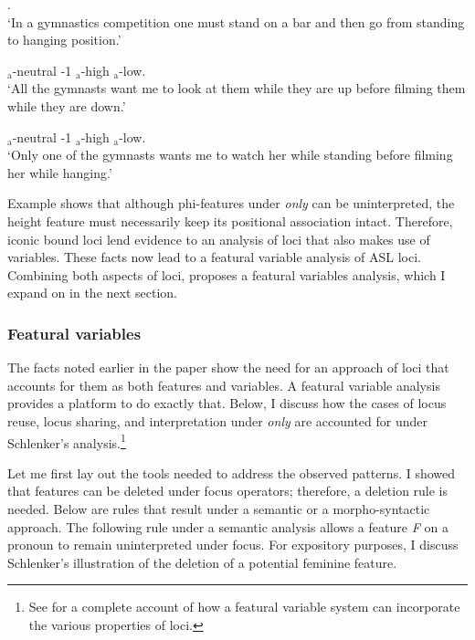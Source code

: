 \documentclass[output=paper,
modfonts
]{langscibook}
\begin{document}
\newpage
\begin{exe}  \label{ex:irani:72}
		\ex {}.\\
		`In a gymnastics competition one must stand on a bar and then go from standing to hanging position.'
	\begin{xlist}	
		\ex  {} $_\text{a}$-{neutral}  -1 $_\text{a}$-{high}  $_\text{a}$-{low}.\\
		`All the gymnasts want me to look at them while they are up before filming them while they are down.'
		
		\ex  {} $_\text{a}$-{neutral}  -1 $_\text{a}$-{high}   $_\text{a}$-{low}. \\
		`Only one of the gymnasts wants me to watch her while standing before filming her while hanging.' \citep[1081]{Schlenker2014}
	\end{xlist}     
\end{exe}

Example  shows that although phi-features under \textit{only} can be uninterpreted, the height feature must necessarily keep its positional association intact. Therefore, iconic bound loci lend evidence to an analysis of loci that also makes use of variables. These facts now lead to a featural variable analysis of ASL loci. Combining both aspects of loci, \citet{Schlenker2014} proposes a featural variables analysis, which I expand on in the next section. 

\subsubsection{Featural variables}

The facts noted earlier in the paper show the need for an approach of loci that accounts for them as both features and variables. A featural variable analysis \citep{Schlenker2014} provides a platform to do exactly that. Below, I discuss how the cases of locus reuse, locus sharing, and interpretation under \textit{only} are accounted for under Schlenker's analysis.\footnote{See \citet{Schlenker2014} for a complete account of how a featural variable system can incorporate the various properties of loci.}  

Let me first lay out the tools needed to address the observed patterns. I showed that features can be deleted under focus operators; therefore, a deletion rule is needed. Below are rules that result under a semantic or a morpho-syntactic approach. The following rule under a semantic analysis allows a feature \textit{F} on a pronoun to remain uninterpreted under focus. For expository purposes, I discuss Schlenker's illustration of the deletion of a potential feminine feature.  
\end{document}
